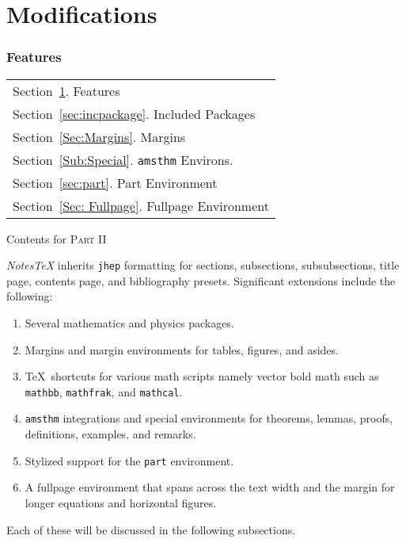 \documentclass[10pt]{article}
\begin{document}
\part{Modifications}\label{Part:Modification}
\section{Features}\label{sec:Features}
\begin{margintable}\vspace{1.4in}\footnotesize{}
	\begin{tabularx}{\marginparwidth}{|X}
		Section~\ref{sec:Features}. Features                 \\
		Section~\ref{sec:incpackage}. Included Packages      \\
		Section~\ref{Sec:Margins}. Margins                   \\
		Section~\ref{Sub:Special}. \texttt{amsthm} Environs. \\
		Section~\ref{sec:part}. Part Environment             \\
		Section~\ref{Sec: Fullpage}. Fullpage Environment    \\
	\end{tabularx}
	\caption{Contents for \textsc{Part II}}
\end{margintable}
\textit{NotesTeX} inherits \texttt{jhep} formatting for sections, subsections, subsubsections, title page, contents page, and bibliography presets. Significant extensions include the following:
\begin{enumerate}
	\item{} Several mathematics and physics packages.
	\item{} Margins and margin environments for tables, figures, and asides.
	\item{} \TeX\ shortcuts for various math scripts namely vector bold math such as \texttt{mathbb}, \texttt{mathfrak}, and \texttt{mathcal}.
	\item{} \texttt{amsthm} integrations and special environments for theorems, lemmas, proofs, definitions, examples, and remarks.\
	\item{} Stylized support for the \texttt{part} environment.
	\item{} A fullpage environment that spans across the text width and the margin for longer equations and horizontal figures.
\end{enumerate}
Each of these will be discussed in the following subsections.

\newpage{}
\end{document}
